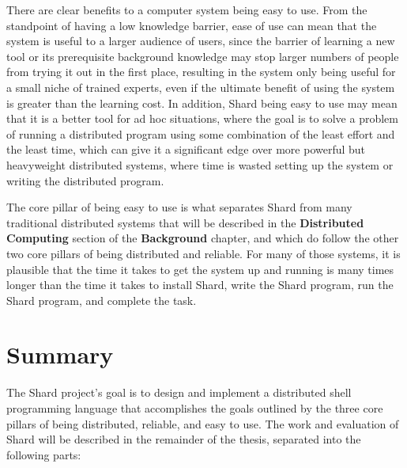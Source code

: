 \documentclass[oneside]{report}
\begin{document}
There are clear benefits to a computer system being easy to use.
From the standpoint of having a low knowledge barrier, ease of use can mean that the system is useful to a larger audience of users, since the barrier of learning a new tool or its prerequisite background knowledge may stop larger numbers of people from trying it out in the first place, resulting in the system only being useful for a small niche of trained experts, even if the ultimate benefit of using the system is greater than the learning cost.
In addition, Shard being easy to use may mean that it is a better tool for ad hoc situations, where the goal is to solve a problem of running a distributed program using some combination of the least effort and the least time, which can give it a significant edge over more powerful but heavyweight distributed systems, where time is wasted setting up the system or writing the distributed program.

The core pillar of being easy to use is what separates Shard from many traditional distributed systems that will be described in the \textbf{Distributed Computing} section of the \textbf{Background} chapter, and which do follow the other two core pillars of being distributed and reliable. For many of those systems, it is plausible that the time it takes to get the system up and running is many times longer than the time it takes to install Shard, write the Shard program, run the Shard program, and complete the task.

\section{Summary}

The Shard project's goal is to design and implement a distributed shell programming language that accomplishes the goals outlined by the three core pillars of being distributed, reliable, and easy to use.
The work and evaluation of Shard  will be described in the remainder of the thesis, separated into the following parts:
\end{document}
